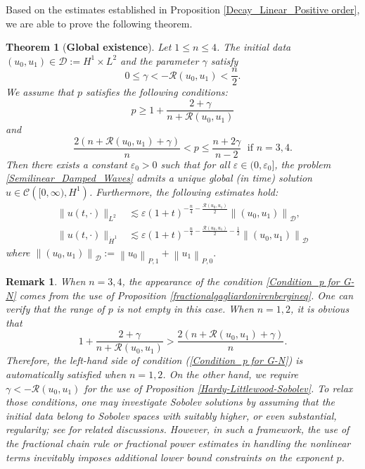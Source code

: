 \documentclass[11pt,reqno]{amsart}
\newtheorem{theorem}{Theorem}[section]
\newtheorem{remark}{Remark}[section]
\begin{document}
Based on the estimates established in Proposition \ref{Decay_Linear_Positive order}, we are able to prove the following theorem.
\begin{theorem}[\textbf{Global existence}] \label{Thm_Global existence}
Let $1 \leq n \leq 4$. The initial data $\left(u_0, u_1\right) \in \mathcal{D} := H^1\times L^2$ and the parameter $\gamma$ satisfy
\begin{equation}\label{Condition_R(u_0,u_1)}
0 \leq \gamma < -\mathcal{R}(u_0, u_1) < \frac{n}{2}.
\end{equation}
 We assume that $p$ satisfies the following conditions:
\begin{equation} \label{Condition_p>p crit}
p \geq 1+ \frac{2+\gamma}{n + \mathcal{R}(u_0, u_1)}
\end{equation}
and 
\begin{equation} \label{Condition_p for G-N}
\frac{2(n+\mathcal{R}(u_0, u_1)+\gamma)}{n} < p \leq \frac{n+2\gamma}{n-2}\;\text{ if }n=3,4. 
\end{equation}
Then there exists a constant $\varepsilon_0>0$ such that for all $\varepsilon \in (0,\varepsilon_0]$, the problem \eqref{Semilinear_Damped_Waves} admits a unique global (in time) solution $u \in \mathcal{C}\left([0, \infty), H^1\right)$. Furthermore, the following estimates hold:
\begin{align}
\|u(t,\cdot)\|_{L^2}&\lesssim \varepsilon(1+t)^{-\frac{n}{4}-\frac{\mathcal{R}(u_0, u_1)}{2}}\left\|\left(u_0, u_1\right)\right\|_{\mathcal{D}},\label{decay_estimate1}\\
\|u(t,\cdot)\|_{\dot{H}^1}&\lesssim \varepsilon(1+t)^{-\frac{n}{4}-\frac{\mathcal{R}(u_0, u_1)}{2}-\frac{1}{2}}\left\|\left(u_0, u_1\right)\right\|_{\mathcal{D}}\label{decay_estimate2}
\end{align}
where
$
    \left\|\left(u_0, u_1\right)\right\|_{\mathcal{D}}:=\left\|u_0\right\|_{P, 1}+\left\|u_1\right\|_{P, 0}.
$
\end{theorem}
\begin{remark}\label{Rem_Restrict Condition_Thm Global existence}
\selectfont
When $n =3,4$, the appearance of the condition \eqref{Condition_p for G-N} comes from the use of Proposition \ref{fractionalgagliardonirenbergineq}. One can verify that the range of $p$ is not empty in this case. When $n=1,2$, it is obvious that $$1+\frac{2+\gamma}{n+\mathcal{R}(u_0, u_1)} > \frac{2(n+\mathcal{R}(u_0,u_1)+\gamma)}{n}.$$  Therefore, the left-hand side of condition (\ref{Condition_p for G-N}) is automatically satisfied when $n=1,2$. On the other hand, we require $\gamma<-\mathcal{R}(u_0, u_1)$ for the use of Proposition \ref{Hardy-Littlewood-Sobolev}. To relax those conditions, one may investigate Sobolev solutions by assuming that the initial data belong to Sobolev spaces with suitably higher, or even substantial, regularity; see \cite{Palmieri2018} for related discussions. However, in such a framework, the use of the fractional chain rule or fractional power estimates in handling the nonlinear terms inevitably imposes additional lower bound constraints on the exponent $p$.
\end{remark}
\end{document}
